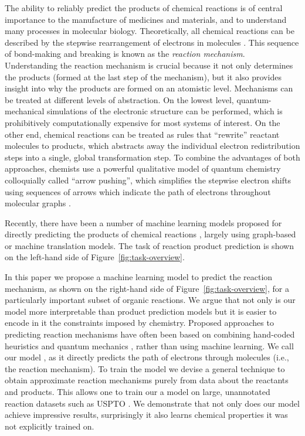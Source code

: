 
The ability to reliably predict the products of chemical reactions is of central importance to the manufacture of medicines and materials, and to understand many processes in molecular biology.
Theoretically, all chemical reactions can be described by the stepwise rearrangement of electrons in molecules \citep{herges1994organizing}. 
This sequence of bond-making and breaking is known as the \emph{reaction mechanism}. 
Understanding the reaction mechanism is crucial because it not only determines the products (formed at the last step of the mechanism), 
but it also provides insight into why the products are formed on an atomistic level. 
%
Mechanisms can be treated at different levels of abstraction. 
On the lowest level, quantum-mechanical simulations of the electronic structure can be performed, which is prohibitively computationally expensive for most systems of interest. 
On the other end, chemical reactions can be treated as rules that ``rewrite'' reactant molecules to products, which abstracts away the individual electron redistribution steps into a single, global transformation step. 
To combine the advantages of both approaches, chemists use a powerful qualitative model of quantum chemistry colloquially called ``arrow pushing'', which simplifies the stepwise electron shifts using sequences of arrows which indicate the path of electrons throughout molecular graphs \citep{herges1994organizing}. 

Recently, there have been a number of machine learning models proposed for directly predicting the products of chemical reactions \citep{coley2017prediction,jin2017predicting,schwaller2017found,neural-symbolic,segler2018planning,wei2016neural}, largely using graph-based or machine translation models. 
The task of reaction product prediction is shown on the left-hand side of Figure~\ref{fig:task-overview}. 

In this paper we propose a machine learning model to predict the reaction mechanism, as shown on the right-hand side of Figure~\ref{fig:task-overview}, for a particularly important subset of organic reactions.
We argue that not only is our model more interpretable than product prediction models but it is easier to encode in it the constraints imposed by chemistry. 
Proposed approaches to predicting reaction mechanisms have often been based on combining hand-coded heuristics and quantum mechanics \citep{bergeler2015heuristics,kim2018efficient,nandi2017tabu,rappoport2014complex,simm2017context,zimmerman2013automated}, 
rather than using machine learning.
We call our model \ourModel, as it directly predicts the path of electrons through molecules (i.e., the reaction mechanism). 
To train the model we devise a general technique to obtain approximate reaction mechanisms purely from data about the reactants and products. 
This allows one to train our a model on large, unannotated reaction datasets such as USPTO \cite{lowe2012extraction}. We demonstrate that not only does our model achieve impressive results, surprisingly it also learns chemical properties it was not explicitly trained on.



